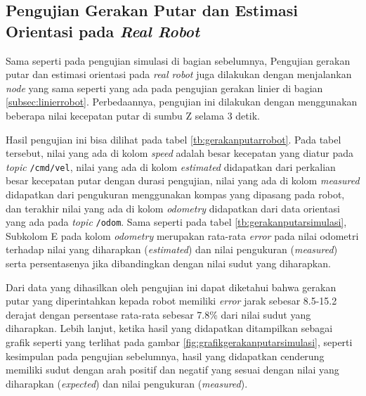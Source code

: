 \subsection{Pengujian Gerakan Putar dan Estimasi Orientasi pada \emph{Real Robot}}
\label{subsec:putarrobot}

Sama seperti pada pengujian simulasi di bagian sebelumnya,
  Pengujian gerakan putar dan estimasi orientasi pada \emph{real robot} juga dilakukan dengan menjalankan \emph{node} yang sama seperti yang ada pada pengujian gerakan linier di bagian \ref{subsec:linierrobot}.
Perbedaannya, pengujian ini dilakukan dengan menggunakan beberapa nilai kecepatan putar di sumbu Z selama 3 detik.



Hasil pengujian ini bisa dilihat pada tabel \ref{tb:gerakanputarrobot}.
Pada tabel tersebut, nilai yang ada di kolom \emph{speed} adalah besar kecepatan yang diatur pada \emph{topic} \lstinline{/cmd/vel},
  nilai yang ada di kolom \emph{estimated} didapatkan dari perkalian besar kecepatan putar dengan durasi pengujian,
  nilai yang ada di kolom \emph{measured} didapatkan dari pengukuran menggunakan kompas yang dipasang pada robot,
  dan terakhir nilai yang ada di kolom \emph{odometry} didapatkan dari data orientasi yang ada pada \emph{topic} \lstinline{/odom}.
Sama seperti pada tabel \ref{tb:gerakanputarsimulasi},
  Subkolom E pada kolom \emph{odometry} merupakan rata-rata \emph{error} pada nilai odometri terhadap nilai yang diharapkan (\emph{estimated}) dan nilai pengukuran (\emph{measured}) serta persentasenya jika dibandingkan dengan nilai sudut yang diharapkan.

Dari data yang dihasilkan oleh pengujian ini dapat diketahui bahwa gerakan putar yang diperintahkan kepada robot memiliki \emph{error} jarak sebesar 8.5-15.2 derajat dengan persentase rata-rata sebesar 7.8\% dari nilai sudut yang diharapkan.
Lebih lanjut, ketika hasil yang didapatkan ditampilkan sebagai grafik seperti yang terlihat pada gambar \ref{fig:grafikgerakanputarsimulasi},
  seperti kesimpulan pada pengujian sebelumnya,
  hasil yang didapatkan cenderung memiliki sudut dengan arah positif dan negatif yang sesuai dengan nilai yang diharapkan (\emph{expected}) dan nilai pengukuran (\emph{measured}).


